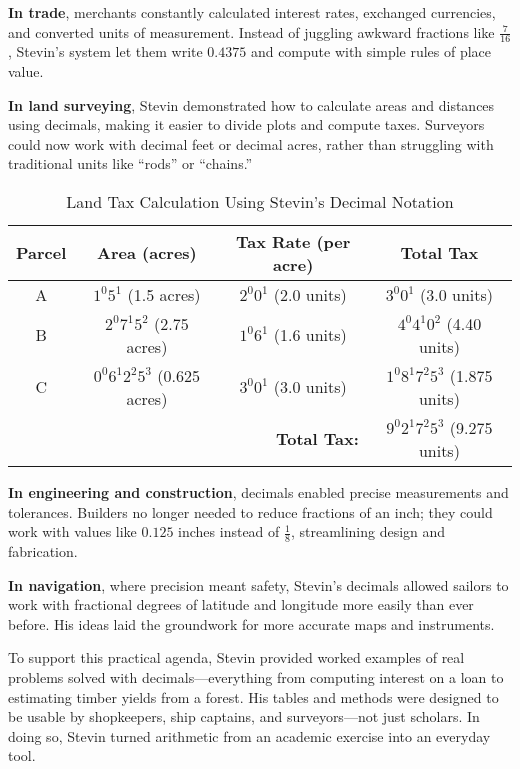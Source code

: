 \textbf{In trade}, merchants constantly calculated interest rates, exchanged currencies, and converted units of measurement. Instead of juggling awkward fractions like \( \frac{7}{16} \), Stevin’s system let them write \( 0.4375 \) and compute with simple rules of place value.

\textbf{In land surveying}, Stevin demonstrated how to calculate areas and distances using decimals, making it easier to divide plots and compute taxes. Surveyors could now work with decimal feet or decimal acres, rather than struggling with traditional units like “rods” or “chains.”

\begin{table}[H]
    \centering
    \caption{Land Tax Calculation Using Stevin’s Decimal Notation}
    \renewcommand{\arraystretch}{1.3}
    \begin{tabular}{|c|c|c|c|}
    \hline
    \textbf{Parcel} & \textbf{Area (acres)} & \textbf{Tax Rate (per acre)} & \textbf{Total Tax} \\
    \hline
    A & $1^{0}5^{1}$ (1.5 acres) & $2^{0}0^{1}$ (2.0 units) & $3^{0}0^{1}$ (3.0 units) \\
    B & $2^{0}7^{1}5^{2}$ (2.75 acres) & $1^{0}6^{1}$ (1.6 units) & $4^{0}4^{1}0^{2}$ (4.40 units) \\
    C & $0^{0}6^{1}2^{2}5^{3}$ (0.625 acres) & $3^{0}0^{1}$ (3.0 units) & $1^{0}8^{1}7^{2}5^{3}$ (1.875 units) \\
    \hline
    \multicolumn{3}{|r|}{\textbf{Total Tax:}} & $9^{0}2^{1}7^{2}5^{3}$ (9.275 units) \\
    \hline
    \end{tabular}
\end{table}

\textbf{In engineering and construction}, decimals enabled precise measurements and tolerances. Builders no longer needed to reduce fractions of an inch; they could work with values like \( 0.125 \) inches instead of \( \frac{1}{8} \), streamlining design and fabrication.

\textbf{In navigation}, where precision meant safety, Stevin’s decimals allowed sailors to work with fractional degrees of latitude and longitude more easily than ever before. His ideas laid the groundwork for more accurate maps and instruments.

To support this practical agenda, Stevin provided worked examples of real problems solved with decimals—everything from computing interest on a loan to estimating timber yields from a forest. His tables and methods were designed to be usable by shopkeepers, ship captains, and surveyors—not just scholars. In doing so, Stevin turned arithmetic from an academic exercise into an everyday tool.

